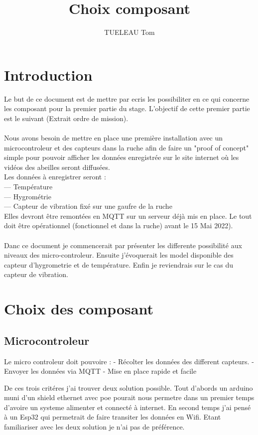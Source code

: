 \documentclass[5pt]{article}
\title{Choix composant}
\author{TUELEAU Tom}
\begin{document}
\maketitle

\section{Introduction}

Le but de ce document est de mettre par ecris les possibiliter en ce qui concerne les composant pour la premier partie du stage. L'objectif de cette premier partie est le suivant (Extrait ordre de mission).\\ 
\\
Nous avons besoin de mettre en place une première installation avec un microcontroleur et
des capteurs dans la ruche afin de faire un "proof of concept" simple pour pouvoir afficher les
données enregistrée sur le site internet où les vidéos des abeilles seront diffusées.\\
Les données à enregistrer seront :\\
— Température\\
— Hygrométrie\\
— Capteur de vibration fixé sur une gaufre de la ruche\\
Elles devront être remontées en MQTT sur un serveur déjà mis en place.
Le tout doit être opérationnel (fonctionnel et dans la ruche) avant le 15 Mai 2022).
\\
\\
Danc ce document je commencerait par présenter les differente possibilité aux niveaux des micro-controleur. Ensuite j'évoquerait les model disponible des capteur d'hygrometrie et de température. Enfin je reviendrais sur le cas du capteur de vibration.

\newpage{}
\section{Choix des composant}

\subsection{Microcontroleur}
Le micro controleur doit pouvoire :
	- Récolter les données des different capteurs.
	- Envoyer les données via MQTT
	- Mise en place rapide et facile

De ces trois critéres j'ai trouver deux solution possible. 
Tout d'abords un arduino muni d'un shield ethernet avec poe pourait nous permetre dans un premier temps d'avoire un systeme alimenter et connecté à internet. 
En second temps j'ai pensé à un Esp32 qui permetrait de faire transiter les données en Wifi. 
Etant familiariser avec les deux solution je n'ai pas de préférence.
\end{document}
